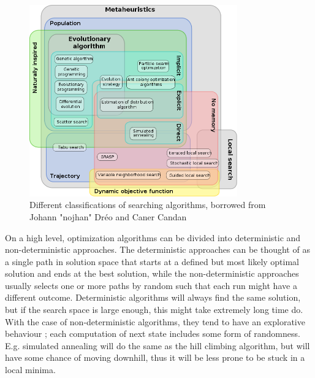\begin{figure}
    \centering
    \includegraphics[width=0.8\textwidth]{figs/630px-Metaheuristics_classification.png}
    \caption{Different classifications of searching algorithms, borrowed from Johann "nojhan" Dréo and Caner Candan\cite{wikimetaheuristics}}
    \label{fig:metaheuristics}
\end{figure}

On a high level, optimization algorithms can be divided into deterministic and
non-deterministic approaches. The deterministic approaches can be thought of as
a single path in solution space that starts at a defined but most likely optimal
solution and ends at the best solution, while the non-deterministic approaches
usually selects one or more paths by random such that each run might have a
different outcome. Deterministic algorithms will always find the same solution,
but if the search space is large enough, this might take extremely long time do.
With the case of non-deterministic algorithms, they tend to have an
explorative behaviour \cite{poli2008field}; each computation of next state
includes some form of randomness. E.g. simulated annealing will do the same as
the hill climbing algorithm, but will have some chance of moving downhill, thus
it will be less prone to be stuck in a local minima.



